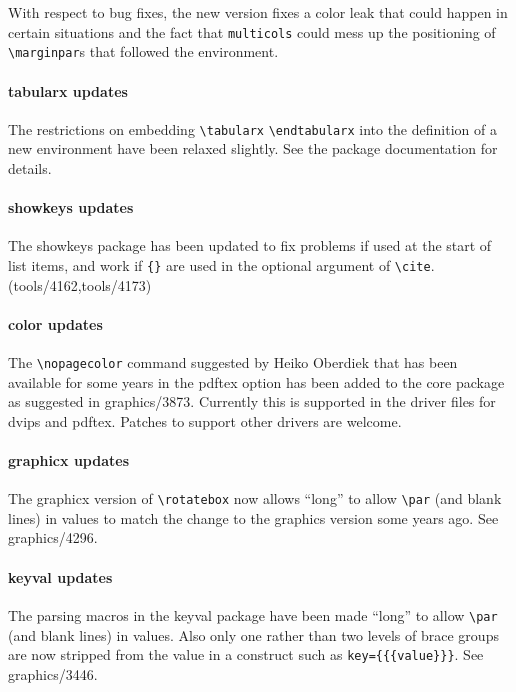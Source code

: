\documentclass{ltnews}
\begin{document}
With respect to bug fixes, the new version fixes a color leak that
could happen in certain situations and the fact that
\texttt{multicols} could mess up the positioning of
\verb=\marginpar=s that followed the environment.

\paragraph{\textsf{tabularx} updates}

The restrictions on embedding \verb|\tabularx| \verb|\endtabularx|
into the definition of a new environment have been relaxed
slightly. See the package documentation for details.

\paragraph{\textsf{showkeys} updates}

The \textsf{showkeys} package has been updated to fix problems if used
at the start of list items, and work if \verb|{}| are used in the
optional argument of \verb|\cite|. (tools/4162,tools/4173)


\paragraph{\textsf{color} updates}

The \verb|\nopagecolor| command suggested by Heiko Oberdiek that has
been available for some years in the \textsf{pdftex} option has been
added to the core package as suggested in graphics/3873. Currently
this is supported in the driver files for \textsf{dvips} and
\textsf{pdftex}.  Patches to support other drivers are welcome.

 \paragraph{\textsf{graphicx} updates}

The \textsf{graphicx} version of \verb|\rotatebox| now allows ``long''
to allow \verb|\par| (and blank lines) in values to match the change
to the \textsf{graphics} version some years ago. See graphics/4296.

\paragraph{\textsf{keyval} updates}

The parsing macros in the \textsf{keyval} package have been made
``long'' to allow \verb|\par| (and blank lines) in values. Also only
one rather than two levels of brace groups are now stripped from the
value in a construct such as \verb|key={{{value}}}|. See
graphics/3446.
\end{document}
